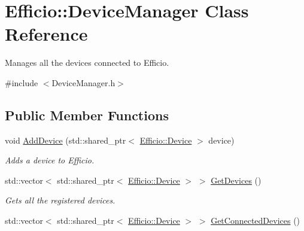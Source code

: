 \hypertarget{class_efficio_1_1_device_manager}{}\section{Efficio\+:\+:Device\+Manager Class Reference}
\label{class_efficio_1_1_device_manager}


Manages all the devices connected to Efficio.  




{\ttfamily \#include $<$Device\+Manager.\+h$>$}

\subsection*{Public Member Functions}
\begin{DoxyCompactItemize}
\item 
void \hyperlink{class_efficio_1_1_device_manager_a4025caa83ba0dd4b4ba619654e4bf791}{Add\+Device} (std\+::shared\+\_\+ptr$<$ \hyperlink{class_efficio_1_1_device}{Efficio\+::\+Device} $>$ device)\hypertarget{class_efficio_1_1_device_manager_a4025caa83ba0dd4b4ba619654e4bf791}{}\label{class_efficio_1_1_device_manager_a4025caa83ba0dd4b4ba619654e4bf791}

\begin{DoxyCompactList}\small\item\em Adds a device to Efficio. \end{DoxyCompactList}\item 
std\+::vector$<$ std\+::shared\+\_\+ptr$<$ \hyperlink{class_efficio_1_1_device}{Efficio\+::\+Device} $>$ $>$ \hyperlink{class_efficio_1_1_device_manager_abed1c1e08d2fe7defef21fded68782b9}{Get\+Devices} ()\hypertarget{class_efficio_1_1_device_manager_abed1c1e08d2fe7defef21fded68782b9}{}\label{class_efficio_1_1_device_manager_abed1c1e08d2fe7defef21fded68782b9}

\begin{DoxyCompactList}\small\item\em Gets all the registered devices. \end{DoxyCompactList}\item 
std\+::vector$<$ std\+::shared\+\_\+ptr$<$ \hyperlink{class_efficio_1_1_device}{Efficio\+::\+Device} $>$ $>$ \hyperlink{class_efficio_1_1_device_manager_a21da4a9f44bc128e70115de8ab54bc4e}{Get\+Connected\+Devices} ()\hypertarget{class_efficio_1_1_device_manager_a21da4a9f44bc128e70115de8ab54bc4e}{}\label{class_efficio_1_1_device_manager_a21da4a9f44bc128e70115de8ab54bc4e}


\end{DoxyCompactItemize}

